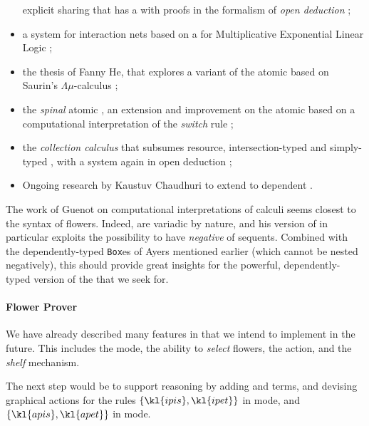 \begin{scope}
\begin{itemize}
  explicit sharing that has a  with proofs in the
  formalism of \emph{open deduction} ;
  \item a  system for interaction nets based on a  for
  Multiplicative Exponential Linear Logic ;
  \item the thesis of Fanny He, that explores a  variant of the atomic
   based on Saurin's $\Lambda\mu$-calculus
  ;
  \item the \emph{spinal} atomic , an extension and
  improvement on the atomic  based on a computational
  interpretation of the \emph{switch} rule ;
  \item the \emph{collection calculus} that subsumes resource,
  intersection-typed and simply-typed , with a  system
  again in open deduction ;
  \item Ongoing research by Kaustuv Chaudhuri to extend  to
  dependent .
\end{itemize}
The work of Guenot on computational interpretations of  calculi
seems closest to the syntax of flowers. Indeed,  are variadic by
nature, and his version of  in particular exploits the
possibility to have \emph{negative}  of sequents. Combined with the
dependently-typed \texttt{Box}es of Ayers mentioned earlier (which cannot be
nested negatively), this should provide great insights for the powerful,
dependently-typed version of the  that we seek for.

\paragraph{Flower Prover}

We have already described many features in  that we
intend to implement in the future. This includes the  mode, the
ability to \emph{select} flowers, the   action, and the
\emph{shelf} mechanism.

The next step would be to support  reasoning by adding  and
 terms, and devising graphical actions for the rules $\{\kl{ipis},
\kl{ipet}\}$ in  mode, and $\{\kl{apis}, \kl{apet}\}$ in  mode.


\end{scope}
